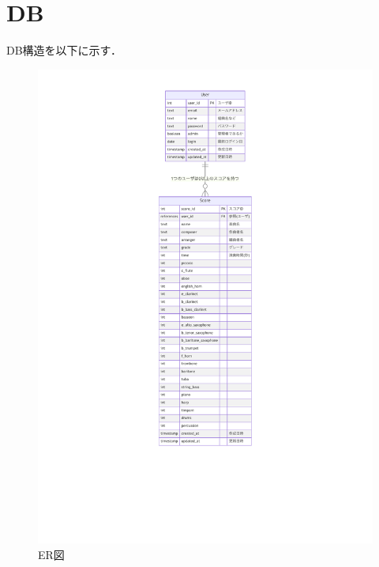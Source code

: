 \chapter{DB}
DB構造を以下に示す．
\begin{figure}
    \centering
    \includegraphics[scale=0.7]{img/etc/db-er.pdf}
    \vspace{-1cm}
    \caption{ER図}
\end{figure}